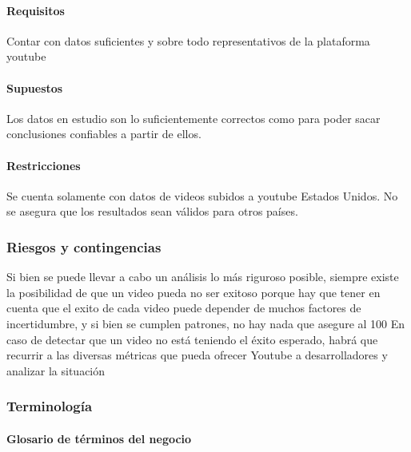         \paragraph{Requisitos}
        Contar con datos suficientes y sobre todo representativos de la
        plataforma youtube
        \paragraph{Supuestos}
        Los datos en estudio son lo suficientemente correctos como para poder
        sacar conclusiones confiables a partir de ellos.
        \paragraph{Restricciones}
        Se cuenta solamente con datos de videos subidos a youtube
        Estados Unidos. No se asegura que los resultados sean válidos para
        otros países.

    \subsubsection{Riesgos y contingencias}

        Si bien se puede llevar a cabo un análisis lo más riguroso posible, siempre existe la
        posibilidad de que un video pueda no ser exitoso porque hay que tener en
        cuenta que el exito de cada video puede depender de muchos factores de
        incertidumbre, y si bien se cumplen patrones, no hay nada que asegure al
        100%
        En caso de detectar que un video no está teniendo el éxito esperado,
        habrá que recurrir a las diversas métricas que pueda ofrecer Youtube a
        desarrolladores y analizar la situación

    \subsubsection{Terminología}

        \paragraph{Glosario de términos del negocio}

